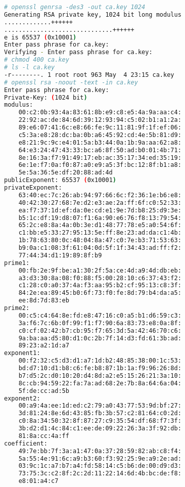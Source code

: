 \begin{lstlisting}[language=bash]
# openssl genrsa -des3 -out ca.key 1024
Generating RSA private key, 1024 bit long modulus
.............++++++
..............................++++++
e is 65537 (0x10001)
Enter pass phrase for ca.key:
Verifying - Enter pass phrase for ca.key:
# chmod 400 ca.key
# ls -l ca.key
-r--------. 1 root root 963 May  4 23:15 ca.key
# openssl rsa -noout -text -in ca.key 
Enter pass phrase for ca.key:
Private-Key: (1024 bit)
modulus:
    00:c2:0b:93:4a:83:61:8b:e9:c8:e5:4a:9a:aa:c4:
    22:92:ac:de:84:6d:39:12:93:94:c5:02:b1:a1:2a:
    89:e6:07:41:6c:e8:66:fe:9c:11:81:9f:1f:ef:06:
    c5:3a:e8:28:dc:ba:0b:a6:45:92:cd:4e:5b:81:d9:
    e8:21:9c:9c:e4:01:5a:b3:44:0a:1b:9a:aa:62:a8:
    64:e3:24:47:43:33:bc:a6:8f:50:ad:b0:01:4b:71:
    8e:16:3a:f7:91:49:17:eb:ac:35:17:34:ed:35:19:
    6e:1e:f7:0a:f0:87:a0:e9:a5:3f:bc:12:8f:b1:a8:
    5e:5a:36:5e:df:20:88:ad:4d
publicExponent: 65537 (0x10001)
privateExponent:
    63:40:ec:7c:26:ab:94:97:66:6c:f2:36:1e:b6:e8:
    40:42:30:27:68:7e:d2:e3:ae:2a:ff:6f:c0:52:33:
    ea:f7:37:1d:ef:da:0e:cd:e1:9e:7d:b8:25:d9:3e:
    b5:1c:df:19:d8:07:f1:6a:90:e6:76:f8:13:79:54:
    65:2c:e8:8a:4a:0b:3e:d1:48:77:78:e5:a0:54:6f:
    c1:bb:e5:33:27:95:13:5e:ff:8e:23:ad:da:c1:4b:
    1b:78:63:80:0c:48:04:8a:47:c0:7e:b3:71:53:63:
    b9:0a:c1:08:3f:61:04:0d:5f:1f:34:43:ad:ff:f2:
    77:44:34:d1:19:89:8f:b9
prime1:
    00:fb:2e:9f:be:a1:30:2f:5a:ce:4d:a9:4d:db:eb:
    a3:d3:30:8a:08:f0:88:f5:00:28:10:c6:37:43:f2:
    c1:28:c0:a0:37:4a:f3:aa:95:b2:cf:95:13:c8:3f:
    84:2e:ea:89:45:b0:6f:73:f0:fe:8d:79:b4:da:a5:
    ee:8d:7d:83:eb
prime2:
    00:c5:c4:64:8e:fd:e8:47:16:c0:a5:b1:d6:59:c3:
    3a:f6:7c:6b:0f:99:f1:f7:90:6a:83:73:e8:0a:8f:
    c0:cf:02:42:b7:cb:95:f7:65:3d:5a:42:46:70:c6:
    9a:ba:aa:d5:80:d1:0c:2b:7f:14:d3:fd:61:3b:ad:
    89:23:a2:1d:a7
exponent1:
    00:f2:32:c5:d3:d1:a7:1d:b2:48:85:38:00:1c:53:
    bd:d7:10:d1:b8:c6:fe:b8:87:1b:1a:f9:96:26:8d:
    b7:d5:2c:d0:10:20:d4:8d:a2:e5:15:26:21:3a:10:
    8c:cb:94:59:22:fa:7a:ad:68:2e:7b:8a:64:6a:04:
    5f:de:cc:ad:5b
exponent2:
    00:a9:4a:ee:1d:ed:c2:79:a0:43:77:53:9d:bf:27:
    3d:81:24:8e:6d:43:85:fb:3b:57:c2:81:64:c0:2d:
    c0:8a:34:50:32:8f:87:27:c9:35:54:df:68:f7:3f:
    3b:d2:d1:4c:84:c1:ee:de:09:22:26:3a:3f:92:db:
    81:8a:cc:4a:ff
coefficient:
    49:7e:bb:7f:3a:a1:47:0a:37:28:59:82:ab:c8:f4:
    5a:55:4e:91:6c:a9:b3:60:f3:92:25:9e:a9:2e:ad:
    03:9c:1c:a7:b7:a4:fd:58:14:c5:b6:de:00:d9:d3:
    73:75:3c:c2:8f:2c:2d:11:22:14:6d:4b:bc:de:f8:
    e8:01:a4:c7
\end{lstlisting}

